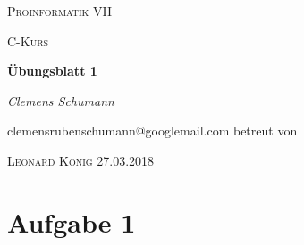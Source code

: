 \documentclass[11pt,a4paper]{article}
\begin{document}
 
 \begin{center}
  {\scshape\LARGE Proinformatik VII \par}
  \vspace{1cm}
  {\scshape\Large C-Kurs \par}
  \vspace{1.5cm}
  {\huge\bfseries \"Ubungsblatt 1 \par}
  \vspace{2cm}
     {\large \itshape{Clemens Schumann}\/ \par}
  \vspace{0.5cm}
  {clemensrubenschumann@googlemail.com}
  \vfill
  betreut von\par
  \textsc{Leonard K\"onig}
  \vfill
  {\Large 27.03.2018}
 
 \end{center}
 
 \thispagestyle{empty}
 
 \newpage
 \setcounter{page}{1}

    \section{Aufgabe 1}
\end{document}
